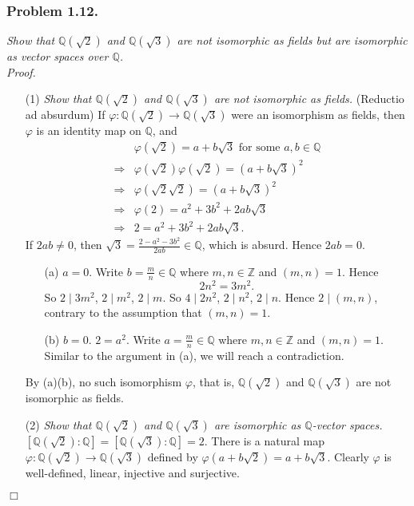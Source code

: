 \documentclass{article}
\begin{document}
\subsubsection*{Problem 1.12.}
\emph{Show that $\mathbb{Q}(\sqrt{2})$ and $\mathbb{Q}(\sqrt{3})$
are not isomorphic as fields but are isomorphic as vector spaces over $\mathbb{Q}$.} \\

\emph{Proof.}
\begin{enumerate}
\item[(1)]
\emph{Show that $\mathbb{Q}(\sqrt{2})$ and $\mathbb{Q}(\sqrt{3})$
are not isomorphic as fields.}
(Reductio ad absurdum)
If $\varphi: \mathbb{Q}(\sqrt{2}) \to \mathbb{Q}(\sqrt{3})$ were an isomorphism
as fields, then $\varphi$ is an identity map on $\mathbb{Q}$, and
\begin{align*}
&\varphi(\sqrt{2}) = a + b\sqrt{3} \text{ for some } a, b \in \mathbb{Q} \\
\Longrightarrow&
\varphi(\sqrt{2})\varphi(\sqrt{2}) = (a + b\sqrt{3})^2 \\
\Longrightarrow&
\varphi(\sqrt{2} \sqrt{2}) = (a + b\sqrt{3})^2 \\
\Longrightarrow&
\varphi(2) = a^2 + 3b^2 + 2ab\sqrt{3} \\
\Longrightarrow&
2 = a^2 + 3b^2 + 2ab\sqrt{3}.
\end{align*}
If $2ab \neq 0$, then $\sqrt{3} = \frac{2-a^2-3b^2}{2ab} \in \mathbb{Q}$,
which is absurd.
Hence $2ab = 0$.
  \begin{enumerate}
  \item[(a)]
  $a = 0$.
  Write $b = \frac{m}{n} \in \mathbb{Q}$ where $m, n \in \mathbb{Z}$ and $(m, n) = 1$.
  Hence
  $$2n^2 = 3m^2.$$
  So $2 \mid 3m^2$, $2 \mid m^2$, $2 \mid m$. So $4 \mid 2n^2$, $2 \mid n^2$, $2 \mid n$.
  Hence $2 \mid (m,n)$, contrary to the assumption that $(m,n) = 1$.
  \item[(b)]
  $b = 0$.
  $2 = a^2$.
  Write $a = \frac{m}{n} \in \mathbb{Q}$ where $m, n \in \mathbb{Z}$ and $(m, n) = 1$.
  Similar to the argument in (a), we will reach a contradiction.
  \end{enumerate}
By (a)(b), no such isomorphism $\varphi$, that is,
$\mathbb{Q}(\sqrt{2})$ and $\mathbb{Q}(\sqrt{3})$
are not isomorphic as fields.
\item[(2)]
\emph{Show that $\mathbb{Q}(\sqrt{2})$ and $\mathbb{Q}(\sqrt{3})$
are isomorphic as $\mathbb{Q}$-vector spaces.}
$[\mathbb{Q}(\sqrt{2}):\mathbb{Q}] = [\mathbb{Q}(\sqrt{3}):\mathbb{Q}] = 2$.
There is a natural map $\varphi: \mathbb{Q}(\sqrt{2}) \to \mathbb{Q}(\sqrt{3})$
defined by $\varphi(a + b\sqrt{2}) = a + b\sqrt{3}$.
Clearly $\varphi$ is well-defined, linear, injective and surjective.
\end{enumerate}
$\Box$ \\\\
\end{document}
